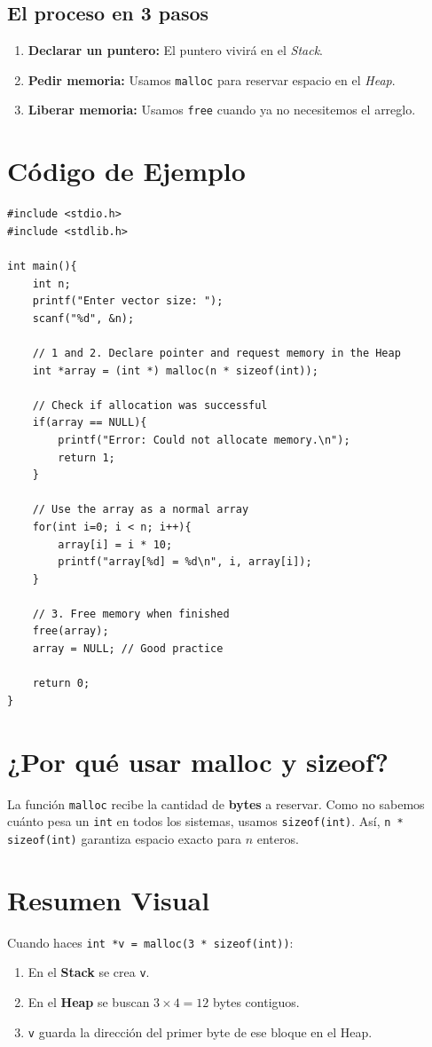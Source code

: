 \documentclass[12pt,a4paper]{article}
\begin{document}
\subsection{El proceso en 3 pasos}
\begin{enumerate}
    \item \textbf{Declarar un puntero:} El puntero vivirá en el \textit{Stack}.
    \item \textbf{Pedir memoria:} Usamos \texttt{malloc} para reservar espacio en el \textit{Heap}.
    \item \textbf{Liberar memoria:} Usamos \texttt{free} cuando ya no necesitemos el arreglo.
\end{enumerate}

\section{Código de Ejemplo}
\begin{lstlisting}
#include <stdio.h>
#include <stdlib.h>

int main(){
    int n;
    printf("Enter vector size: ");
    scanf("%d", &n);

    // 1 and 2. Declare pointer and request memory in the Heap
    int *array = (int *) malloc(n * sizeof(int));

    // Check if allocation was successful
    if(array == NULL){
        printf("Error: Could not allocate memory.\n");
        return 1;
    }

    // Use the array as a normal array
    for(int i=0; i < n; i++){
        array[i] = i * 10;
        printf("array[%d] = %d\n", i, array[i]);
    }

    // 3. Free memory when finished
    free(array);
    array = NULL; // Good practice

    return 0;
}
\end{lstlisting}

\section{¿Por qué usar malloc y sizeof?}
La función \texttt{malloc} recibe la cantidad de \textbf{bytes} a reservar. Como no sabemos cuánto pesa un \texttt{int} en todos los sistemas, usamos \texttt{sizeof(int)}. Así, \texttt{n * sizeof(int)} garantiza espacio exacto para $n$ enteros.

\section{Resumen Visual}
Cuando haces \texttt{int *v = malloc(3 * sizeof(int))}:
\begin{enumerate}
    \item En el \textbf{Stack} se crea \texttt{v}.
    \item En el \textbf{Heap} se buscan $3 \times 4 = 12$ bytes contiguos.
    \item \texttt{v} guarda la dirección del primer byte de ese bloque en el Heap.
\end{enumerate}
\end{document}
